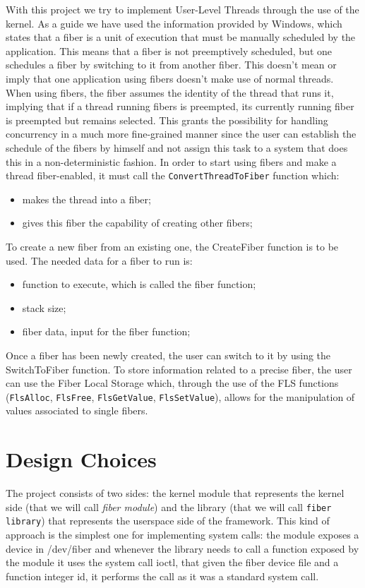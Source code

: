 \documentclass[a4paper,10pt]{article}
\begin{document}
With this project we try to implement User-Level Threads through the use of the kernel. As a guide we have used the information provided by Windows, which states that a fiber is a unit of execution that must be manually scheduled by the application. This means that a fiber is not preemptively scheduled, but one schedules a fiber by switching to it from another fiber. This doesn’t mean or imply that one application using fibers doesn’t make use of normal threads. When using fibers, the fiber assumes the identity of the thread that runs it, implying that if a thread running fibers is preempted, its currently running fiber is preempted but remains selected. This grants the possibility for handling concurrency in a much more fine-grained manner since the user can establish the schedule of the fibers by himself and not assign this task to a system that does this in a non-deterministic fashion.
In order to start using fibers and make a thread fiber-enabled, it must call the \lstinline{ConvertThreadToFiber} function which:
\begin{itemize}
	\item makes the thread into a fiber;
	\item gives this fiber the capability of creating other fibers;
\end{itemize}
To create a new fiber from an existing one, the CreateFiber function is to be used. The needed data for a fiber to run is:
\begin{itemize}
	\item function to execute, which is called the fiber function;
	\item stack size;
	\item fiber data, input for the fiber function;
\end{itemize}

Once a fiber has been newly created, the user can switch to it by using the SwitchToFiber function.
To store information related to a precise fiber, the user can use the Fiber Local Storage which, through the use of the FLS functions (\lstinline{FlsAlloc}, \lstinline{FlsFree}, \lstinline{FlsGetValue}, \lstinline{FlsSetValue}), allows for the manipulation of values associated to single fibers.

\section{Design Choices}
The project consists of two sides: the kernel module that represents the kernel side (that we will call \textit{fiber module}) and the library (that we will call \texttt{fiber library}) that represents the userspace side of the framework. This kind of approach is the simplest one for implementing system calls: the module exposes a device in /dev/fiber and whenever the library needs to call a function exposed by the module it uses the system call ioctl, that given the fiber device file and a function integer id, it performs the call as it was a standard system call.
\end{document}

